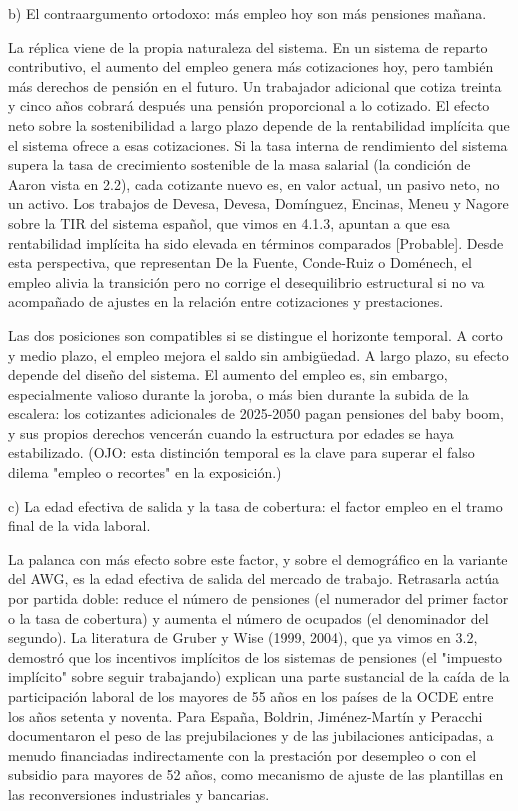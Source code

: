 \documentclass[10pt,a4paper]{article}
\begin{document}
b) El contraargumento ortodoxo: más empleo hoy son más pensiones mañana.

La réplica viene de la propia naturaleza del sistema. En un sistema de reparto contributivo, el aumento del empleo genera más cotizaciones hoy, pero también más derechos de pensión en el futuro. Un trabajador adicional que cotiza treinta y cinco años cobrará después una pensión proporcional a lo cotizado. El efecto neto sobre la sostenibilidad a largo plazo depende de la rentabilidad implícita que el sistema ofrece a esas cotizaciones. Si la tasa interna de rendimiento del sistema supera la tasa de crecimiento sostenible de la masa salarial (la condición de Aaron vista en 2.2), cada cotizante nuevo es, en valor actual, un pasivo neto, no un activo. Los trabajos de Devesa, Devesa, Domínguez, Encinas, Meneu y Nagore sobre la TIR del sistema español, que vimos en 4.1.3, apuntan a que esa rentabilidad implícita ha sido elevada en términos comparados [Probable]. Desde esta perspectiva, que representan De la Fuente, Conde-Ruiz o Doménech, el empleo alivia la transición pero no corrige el desequilibrio estructural si no va acompañado de ajustes en la relación entre cotizaciones y prestaciones.

Las dos posiciones son compatibles si se distingue el horizonte temporal. A corto y medio plazo, el empleo mejora el saldo sin ambigüedad. A largo plazo, su efecto depende del diseño del sistema. El aumento del empleo es, sin embargo, especialmente valioso durante la joroba, o más bien durante la subida de la escalera: los cotizantes adicionales de 2025-2050 pagan pensiones del baby boom, y sus propios derechos vencerán cuando la estructura por edades se haya estabilizado. (OJO: esta distinción temporal es la clave para superar el falso dilema "empleo o recortes" en la exposición.)

c) La edad efectiva de salida y la tasa de cobertura: el factor empleo en el tramo final de la vida laboral.

La palanca con más efecto sobre este factor, y sobre el demográfico en la variante del AWG, es la edad efectiva de salida del mercado de trabajo. Retrasarla actúa por partida doble: reduce el número de pensiones (el numerador del primer factor o la tasa de cobertura) y aumenta el número de ocupados (el denominador del segundo). La literatura de Gruber y Wise (1999, 2004), que ya vimos en 3.2, demostró que los incentivos implícitos de los sistemas de pensiones (el "impuesto implícito" sobre seguir trabajando) explican una parte sustancial de la caída de la participación laboral de los mayores de 55 años en los países de la OCDE entre los años setenta y noventa. Para España, Boldrin, Jiménez-Martín y Peracchi documentaron el peso de las prejubilaciones y de las jubilaciones anticipadas, a menudo financiadas indirectamente con la prestación por desempleo o con el subsidio para mayores de 52 años, como mecanismo de ajuste de las plantillas en las reconversiones industriales y bancarias.
\end{document}
